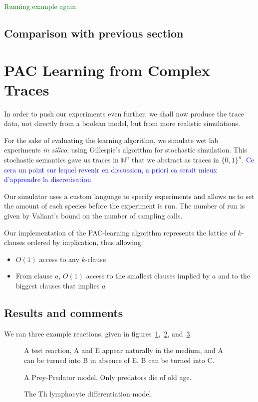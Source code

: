 \documentclass{llncs}
\newcommand{\francois}[1]{\textcolor{blue}{#1}}
\newcommand{\sylvain}[1]{\textcolor{green}{#1}}
\begin{document}
\sylvain{Running example again}

\subsection{Comparison with previous section}

\section{PAC Learning from Complex Traces}

In order to push our experiments even further, we shall now produce the trace
data, not directly from a boolean model, but from more realistic simulations.

For the sake of evaluating the learning algorithm,
we simulate wet lab experiments \emph{in silico}, using Gillespie's algorithm for stochastic simulation.
This stochastic semantics gave us traces in ${\mathbb{N}}^n$ that we abstract as traces in ${\{0,1\}}^n$.
\francois{Ce sera un point sur lequel revenir en discussion, a priori ca serait mieux d'apprendre la discretisation}

Our simulator uses a custom language to specify experiments and allows us to set the amount of each species before the experiment is run. The number of run is given by Valiant's bound on the number of sampling calls.

Our implementation of the PAC-learning algorithm represents the lattice of $k$-clauses ordered by implication, thus allowing:
\begin{itemize}
	\item $O(1)$ access to any $k$-clause
	\item From clause $a$, $O(1)$ access to the smallest clauses implied by $a$ and to the biggest clauses that implies $a$
\end{itemize}


\subsection{Results and comments}

We ran three example reactions, given in figures~\ref{test},~\ref{preypred}, and~\ref{lympho}.
\begin{figure}[htbp]
	
	\vspace{-1em}
	\caption{A test reaction, A and E appear naturally in the medium, and A can be turned into B in absence of E. B  can be turned into C.\label{test}}
\end{figure}
\begin{figure}[htbp]
	
	\vspace{-1em}
	\caption{A Prey-Predator model. Only predators die of old age.\label{preypred}}
\end{figure}
\begin{figure}[htbp]
	
	\vspace{-1em}
	\caption{The Th lymphocyte differentiation model.\label{lympho}}
\end{figure}
\end{document}

